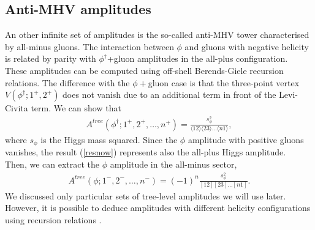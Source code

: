 \subsection{Anti-MHV amplitudes}
An other infinite set of amplitudes is the so-called anti-MHV tower characterised by all-minus gluons. The interaction between $\phi$ and gluons with negative helicity is related by parity with $\phi^\dagger$+gluon amplitudes in the all-plus configuration.\\
These amplitudes can be computed using off-shell Berends-Giele recursion relations. The difference with the $\phi+$gluon case is that the three-point vertex $V(\phi^\dagger;1^+,2^+)$ does not vanish due to an additional term in front of the Levi-Civita term. We can show that \cite{Dixon_2004}
\begin{align}
	A^{tree}(\phi^\dagger; 1^+,2^+,\dots, n^+)=\frac{s_\phi^2}{\langle 12 \rangle \langle 23 \rangle \dots \langle n1 \rangle},	\label{resnow}
\end{align}
where $s_\phi$ is the Higgs mass squared. Since the $\phi$ amplitude with positive gluons vanishes, the result (\ref{resnow}) represents also the all-plus Higgs amplitude.\\
Then, we can extract the $\phi$ amplitude in the all-minus sector,
\begin{align*}
	A^{tree}(\phi;1^-,2^-,\dots,n^-)=(-1)^n\frac{s_\phi^2}{[12][23]\dots [n1]}.
\end{align*}
We discussed only particular sets of tree-level amplitudes we will use later. However, it is possible to deduce amplitudes with different helicity configurations using recursion relations \cite{Dixon_2004}.

